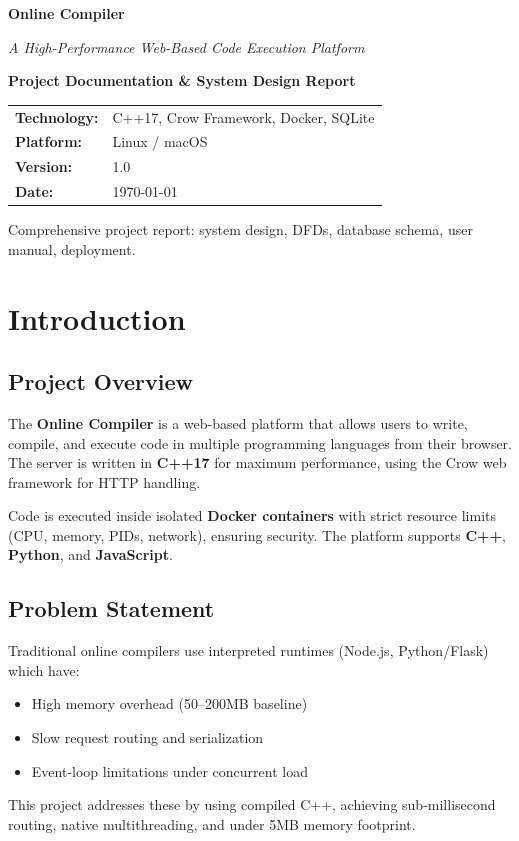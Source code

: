 \documentclass[12pt,a4paper]{report}
\begin{document}
\begin{titlepage}
\centering
\vspace*{2cm}
{\Huge\bfseries Online Compiler\par}
\vspace{0.5cm}
{\Large\itshape A High-Performance Web-Based Code Execution Platform\par}
\vspace{2cm}
{\large\bfseries Project Documentation \& System Design Report\par}
\vspace{2cm}
\begin{tabular}{ll}
\textbf{Technology:} & C++17, Crow Framework, Docker, SQLite \\
\textbf{Platform:} & Linux / macOS \\
\textbf{Version:} & 1.0 \\
\textbf{Date:} & \today \\
\end{tabular}
\vfill
{\small Comprehensive project report: system design, DFDs, database schema, user manual, deployment.}
\end{titlepage}

\tableofcontents
\newpage

\chapter{Introduction}

\section{Project Overview}
The \textbf{Online Compiler} is a web-based platform that allows users to write, compile, and execute code in multiple programming languages from their browser. The server is written in \textbf{C++17} for maximum performance, using the Crow web framework for HTTP handling.

Code is executed inside isolated \textbf{Docker containers} with strict resource limits (CPU, memory, PIDs, network), ensuring security. The platform supports \textbf{C++}, \textbf{Python}, and \textbf{JavaScript}.

\section{Problem Statement}
Traditional online compilers use interpreted runtimes (Node.js, Python/Flask) which have:
\begin{itemize}
    \item High memory overhead (50--200MB baseline)
    \item Slow request routing and serialization
    \item Event-loop limitations under concurrent load
\end{itemize}
This project addresses these by using compiled C++, achieving sub-millisecond routing, native multithreading, and under 5MB memory footprint.
\end{document}
